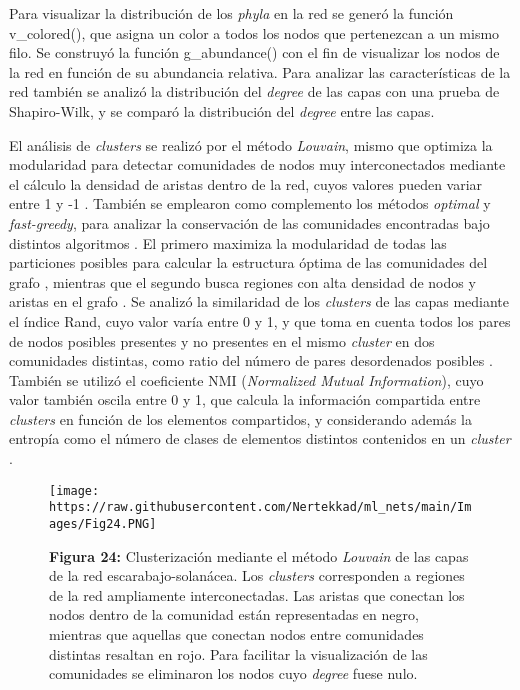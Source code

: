 \documentclass[
]{book}
\begin{document}
Para visualizar la distribución de los \emph{phyla} en la red se generó la función v\_colored(), que asigna un color a todos los nodos que pertenezcan a un mismo filo. Se construyó la función g\_abundance() con el fin de visualizar los nodos de la red en función de su abundancia relativa. Para analizar las características de la red también se analizó la distribución del \emph{degree} de las capas con una prueba de Shapiro-Wilk, y se comparó la distribución del \emph{degree} entre las capas.

El análisis de \emph{clusters} se realizó por el método \emph{Louvain}, mismo que optimiza la modularidad para detectar comunidades de nodos muy interconectados mediante el cálculo la densidad de aristas dentro de la red, cuyos valores pueden variar entre 1 y -1 \citep{combe2015louvain}. También se emplearon como complemento los métodos \emph{optimal} y \emph{fast-greedy}, para analizar la conservación de las comunidades encontradas bajo distintos algoritmos \citep{de2011generalized}. El primero maximiza la modularidad de todas las particiones posibles para calcular la estructura óptima de las comunidades del grafo \citep{klein1991optimal}, mientras que el segundo busca regiones con alta densidad de nodos y aristas en el grafo \citep{kazakovtsev2014genetic}. Se analizó la similaridad de los \emph{clusters} de las capas mediante el índice Rand, cuyo valor varía entre 0 y 1, y que toma en cuenta todos los pares de nodos posibles presentes y no presentes en el mismo \emph{cluster} en dos comunidades distintas, como ratio del número de pares desordenados posibles \citep{yeung2001details}. También se utilizó el coeficiente NMI (\emph{Normalized Mutual Information}), cuyo valor también oscila entre 0 y 1, que calcula la información compartida entre \emph{clusters} en función de los elementos compartidos, y considerando además la entropía como el número de clases de elementos distintos contenidos en un \emph{cluster} \citep{ana2003robust}.

\begin{figure}
\centering
\texttt{[image: https://raw.githubusercontent.com/Nertekkad/ml\_nets/main/Images/Fig24.PNG]}
\caption{\textbf{Figura 24:} Clusterización mediante el método \emph{Louvain} de las capas de la red escarabajo-solanácea. Los \emph{clusters} corresponden a regiones de la red ampliamente interconectadas. Las aristas que conectan los nodos dentro de la comunidad están representadas en negro, mientras que aquellas que conectan nodos entre comunidades distintas resaltan en rojo. Para facilitar la visualización de las comunidades se eliminaron los nodos cuyo \emph{degree} fuese nulo.}
\end{figure}
\end{document}
